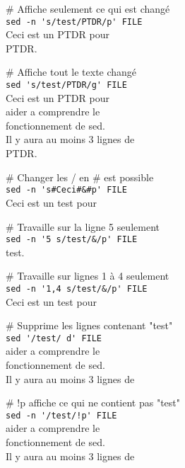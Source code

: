 \documentclass[10pt,landscape]{article}
\begin{document}
\begin{multicols}{3}
\smallskip

\# Affiche seulement ce qui est changé\\
\verb!sed -n 's/test/PTDR/p' FILE!\\
\textrightarrow Ceci est un PTDR pour\\
\textrightarrow PTDR.\\

\smallskip

\# Affiche tout le texte changé\\
\verb!sed 's/test/PTDR/g' FILE!\\
\textrightarrow Ceci est un PTDR pour\\
\textrightarrow aider a comprendre le\\
\textrightarrow fonctionnement de sed.\\
\textrightarrow Il y aura au moins 3 lignes de\\
\textrightarrow PTDR.\\

\smallskip

\# Changer les / en \# est possible\\
\verb!sed -n 's#Ceci#&#p' FILE!\\
\textrightarrow Ceci est un test pour\\

\smallskip

\# Travaille sur la ligne 5 seulement\\
\verb!sed -n '5 s/test/&/p' FILE!\\
\textrightarrow test.\\

\smallskip

\# Travaille sur lignes 1 à 4 seulement\\
\verb!sed -n '1,4 s/test/&/p' FILE!\\
\textrightarrow Ceci est un test pour\\

\smallskip

\# Supprime les lignes contenant "test"\\
\verb!sed '/test/ d' FILE!\\
\textrightarrow aider a comprendre le\\
\textrightarrow fonctionnement de sed.\\
\textrightarrow Il y aura au moins 3 lignes de\\

\smallskip

\# !p affiche ce qui ne contient pas "test"\\
\verb|sed -n '/test/!p' FILE|\\
\textrightarrow aider a comprendre le\\
\textrightarrow fonctionnement de sed.\\
\textrightarrow Il y aura au moins 3 lignes de\\


\end{multicols}
\end{document}
